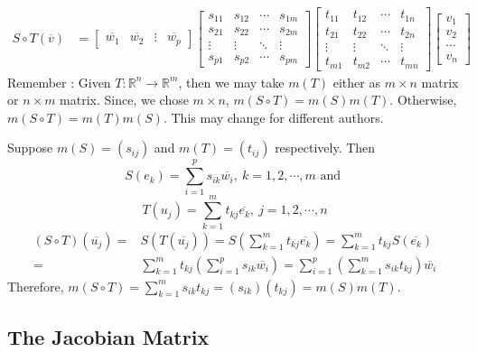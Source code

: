 \begin{commentary}
\begin{align*}
	S \circ T(\overline{v}) & = \begin{bmatrix} \overline{w_1} & \overline{w_2} & \vdots & \overline{w_p} \end{bmatrix} \begin{bmatrix} s_{11} & s_{12} & \cdots & s_{1m} \\ s_{21} & s_{22} & \cdots & s_{2m} \\ \vdots & \vdots & \ddots & \vdots \\ s_{p1} & s_{p2} & \cdots & s_{pm} \end{bmatrix} \begin{bmatrix} t_{11} & t_{12} & \cdots & t_{1n} \\ t_{21} & t_{22} & \cdots & t_{2n} \\ \vdots & \vdots & \ddots & \vdots \\ t_{m1} & t_{m2} & \cdots & t_{mn} \end{bmatrix} \begin{bmatrix} v_1 \\ v_2 \\ \cdots \\ v_n  \end{bmatrix} 
\end{align*}
	Remember : Given $T : \mathbb{R}^n \to \mathbb{R}^m$, then we may take $m(T)$ either as $m \times n$ matrix or $n \times m$ matrix.
	Since, we chose $m \times n$, $m(S \circ T) = m(S)m(T)$.
	Otherwise, $m(S \circ T) = m(T)m(S)$.
	This may change for different authors.\\
\end{commentary}

	Suppose $m(S) = (s_{ij})$ and $m(T) = (t_{ij})$ respectively.
	Then
	\[ S(e_k) = \sum_{i=1}^p s_{ik} \overline{w_i},\ k=1,2,\cdots,m \text{ and }\]
	\[ T(u_j) = \sum_{k=1}^m t_{kj} \overline{e_k},\ j=1,2,\cdots,n \]
	\begin{align*}
		(S \circ T)(\overline{u_j}) = & S(T(\overline{u_j})) = S\left(\sum_{k=1}^m t_{kj}\overline{e_k}\right) = \sum_{k=1}^m t_{kj}S(\overline{e_k}) \\ 
		= & \sum_{k=1}^m t_{kj}\left( \sum_{i=1}^p s_{ik} \overline{w_i}\right) = \sum_{i=1}^p \left(\sum_{k=1}^m s_{ik}t_{kj}\right)\overline{w_i}
	\end{align*}
	Therefore, $m(S \circ T) = \sum_{k=1}^m s_{ik}t_{kj} = (s_{ik})(t_{kj}) =  m(S)m(T)$.

\subsection{The Jacobian Matrix}

